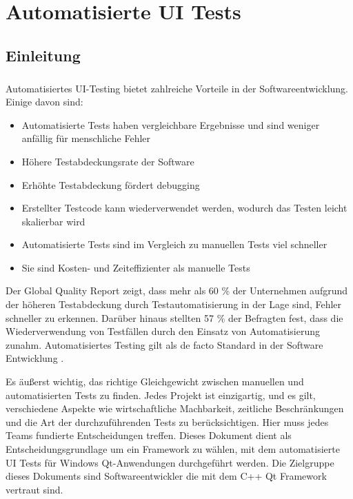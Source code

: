 \chapter{Automatisierte UI Tests}
	\section{Einleitung} 
		\paragraph{} Automatisiertes UI-Testing bietet zahlreiche Vorteile in der Softwareentwicklung. Einige davon sind:
		
		\begin{itemize}
			\item Automatisierte Tests haben vergleichbare Ergebnisse und sind weniger anfällig für menschliche Fehler
			\item Höhere Testabdeckungsrate der Software
			\item Erhöhte Testabdeckung fördert debugging
			\item Erstellter Testcode kann wiederverwendet werden, wodurch das Testen leicht skalierbar wird
			\item Automatisierte Tests sind im Vergleich zu manuellen Tests viel schneller
			\item Sie sind Kosten- und Zeiteffizienter als manuelle Tests
		\end{itemize}		
		
		Der Global Quality Report zeigt, dass mehr als 60 \% der Unternehmen aufgrund der höheren Testabdeckung durch Testautomatisierung in der Lage sind, Fehler schneller zu erkennen. Darüber hinaus stellten 57 \% der Befragten fest, dass die Wiederverwendung von Testfällen durch den Einsatz von Automatisierung zunahm. Automatisiertes Testing gilt als de facto Standard in der Software Entwicklung \cite{capgemini2021microfocus}. 
		
		
		Es äußerst wichtig, das richtige Gleichgewicht zwischen manuellen und automatisierten Tests zu finden. Jedes Projekt ist einzigartig, und es gilt, verschiedene Aspekte wie wirtschaftliche Machbarkeit, zeitliche Beschränkungen und die Art der durchzuführenden Tests zu berücksichtigen. Hier muss jedes Teams fundierte Entscheidungen treffen. Dieses Dokument dient als Entscheidungsgrundlage um ein Framework zu wählen, mit dem automatisierte UI Tests für Windows Qt-Anwendungen durchgeführt werden. Die Zielgruppe dieses Dokuments sind Softwareentwickler die mit dem C++ Qt Framework vertraut sind.
		
